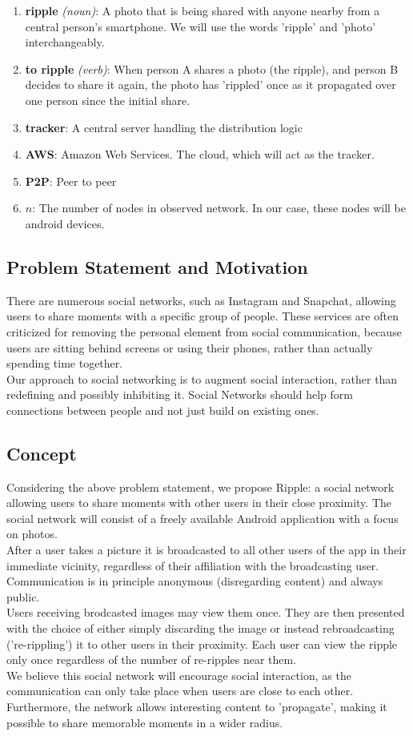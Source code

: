 \documentclass{report}
\begin{document}
\begin{enumerate}
\item \textbf{ripple} \textit{(noun)}: A photo that is being shared with anyone nearby from a central person's smartphone. We will use the words 'ripple' and 'photo' interchangeably. 
\item \textbf{to ripple} \textit{(verb)}: When person A shares a photo (the ripple), and person B decides to share it again, the photo has 'rippled' once as it propagated over one person since the initial share.
\item \textbf{tracker}: A central server handling the distribution logic
\item \textbf{AWS}: Amazon Web Services. The cloud, which will act as the tracker.
\item \textbf{P2P}: Peer to peer
\item \textbf{$ n $}: The number of nodes in observed network. In our case, these nodes will be android devices.
\end{enumerate}

\subsection{Problem Statement and Motivation}
There are numerous social networks, such as Instagram and Snapchat, allowing users to share moments with a specific group of people.
These services are often criticized for removing the personal element from social communication, because users are sitting behind screens or using their phones, rather than actually spending time together.\\
Our approach to social networking is to augment social interaction, rather than redefining and possibly inhibiting it. Social Networks should help form connections between people and not just build on existing ones.

\subsection{Concept}
Considering the above problem statement, we propose Ripple: a social network allowing users to share moments with other users in their close proximity. The social network will consist of a freely available Android application with a focus on photos.\\
After a user takes a picture it is broadcasted to all other users of the app in their immediate vicinity, regardless of their affiliation with the broadcasting user. Communication is in principle anonymous (disregarding content) and always public.\\
Users receiving brodcasted images may view them once. They are then presented with the choice of either simply discarding the image or instead rebroadcasting ('re-rippling') it to other users in their proximity.
Each user can view the ripple only once regardless of the number of re-ripples near them.\\
We believe this social network will encourage social interaction, as the communication can only take place when users are close to each other. Furthermore, the network allows interesting content to 'propagate', making it possible to share memorable moments in a wider radius.
\end{document}
